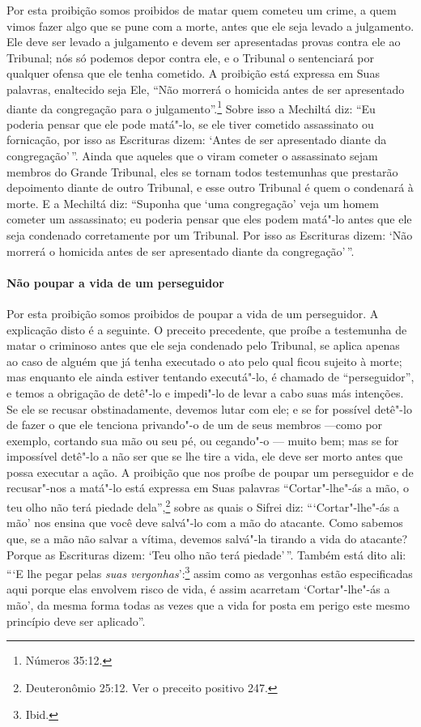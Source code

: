\begin{multicols}{2}
Por esta proibição somos proibidos de matar quem cometeu um crime, a
quem vimos fazer algo que se pune com a morte, antes que ele seja levado
a julgamento. Ele deve ser levado a julgamento e devem ser apresentadas
provas contra ele ao Tribunal; nós só podemos depor contra ele, e o
Tribunal o sentenciará por qualquer ofensa que ele tenha cometido. A
proibição está expressa em Suas palavras, enaltecido seja Ele, ``Não
morrerá o homicida antes de ser apresentado diante da congregação para
o julgamento''.\footnote{Números 35:12.} Sobre isso a Mechiltá\starr{} diz: ``Eu poderia
pensar que ele pode matá"-lo, se ele tiver cometido assassinato ou
fornicação, por isso as Escrituras dizem: `Antes de ser apresentado
diante da congregação'\,''. Ainda que aqueles que o viram cometer o
assassinato sejam membros do Grande Tribunal, eles se tornam todos
testemunhas que prestarão depoimento diante de outro Tribunal, e esse
outro Tribunal é quem o condenará à morte. E a Mechiltá\starr{} diz: ``Suponha
que `uma congregação' veja um homem cometer um assassinato; eu poderia
pensar que eles podem matá"-lo antes que ele seja condenado corretamente
por um Tribunal. Por isso as Escrituras dizem: `Não morrerá o homicida
antes de ser apresentado diante da congregação'\,''.

\paragraph{Não poupar a vida de um perseguidor}

Por esta proibição somos proibidos de poupar a vida de um perseguidor. A
explicação disto é a seguinte. O preceito precedente, que proíbe a
testemunha de matar o criminoso antes que ele seja condenado pelo Tribunal,
se aplica apenas ao caso de alguém que já tenha executado o ato pelo
qual ficou sujeito à morte; mas enquanto ele ainda estiver tentando
executá"-lo, é chamado de ``perseguidor'', e temos a obrigação de detê"-lo
e impedi"-lo de levar a cabo suas más intenções. Se ele se recusar
obstinadamente, devemos lutar com ele; e se for possível detê"-lo de
fazer o que ele tenciona privando"-o de um de seus membros ---como por
exemplo, cortando sua mão ou seu pé, ou cegando"-o --- muito bem; mas se
for impossível detê"-lo a não ser que se lhe tire a vida, ele deve ser
morto antes que possa executar a ação. A proibição que nos proíbe de
poupar um perseguidor e de recusar"-nos a matá"-lo está expressa em Suas
palavras ``Cortar"-lhe"-ás a mão, o teu olho não terá piedade dela'',\footnote{Deuteronômio 25:12. Ver o preceito positivo 247.} sobre as quais o Sifrei\starr{} diz:
```Cortar"-lhe"-ás a mão' nos ensina que você deve salvá"-lo com a mão do
atacante. Como sabemos que, se a mão não salvar a vítima, devemos
salvá"-la tirando a vida do atacante? Porque as Escrituras dizem: `Teu
olho não terá piedade'\,''. Também está dito ali: ```E lhe pegar pelas
\emph{suas vergonhas}':\footnote{Ibid.} assim como as vergonhas estão
especificadas aqui porque elas envolvem risco de vida, é assim acarretam
`Cortar"-lhe"-ás a mão', da mesma forma todas as vezes que a vida for
posta em perigo este mesmo princípio deve ser aplicado''.


\end{multicols}
